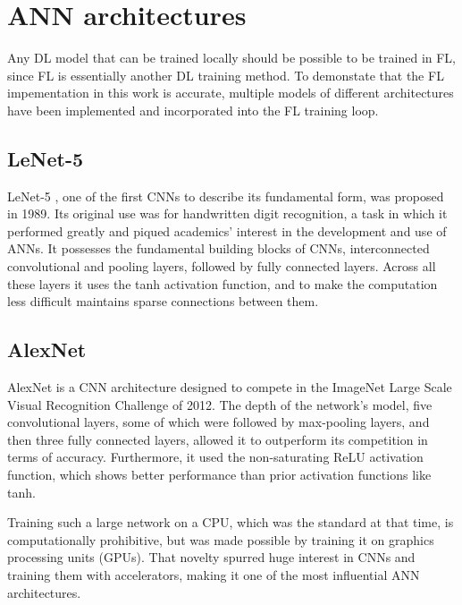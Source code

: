 \section{ANN architectures}
Any DL model that can be trained locally should be possible to be trained in FL, since FL is essentially another DL training method. To demonstate that the FL impementation in this work is accurate, multiple models of different architectures have been implemented and incorporated into the FL training loop. 

\subsection{LeNet-5}
LeNet-5 \cite{LeNet}, one of the first CNNs to describe its fundamental form, was proposed in 1989. Its original use was for handwritten digit recognition, a task in which it performed greatly and piqued academics' interest in the development and use of ANNs. It possesses the fundamental building blocks of CNNs, interconnected convolutional and pooling layers, followed by fully connected layers. Across all these layers it uses the tanh activation function, and to make the computation less difficult maintains sparse connections between them.

\subsection{AlexNet}
AlexNet \cite{Alexnet} is a CNN architecture designed to compete in the ImageNet Large Scale Visual Recognition Challenge of 2012. The depth of the network's model, five convolutional layers, some of which were followed by max-pooling layers, and then three fully connected layers, allowed it to outperform its competition in terms of accuracy. Furthermore, it used the non-saturating ReLU activation function, which shows better performance than prior activation functions like tanh.

Training such a large network on a CPU, which was the standard at that time, is computationally prohibitive, but was made possible by training it on graphics processing units (GPUs). That novelty spurred huge interest in CNNs and training them with accelerators, making it one of the most influential ANN architectures.

